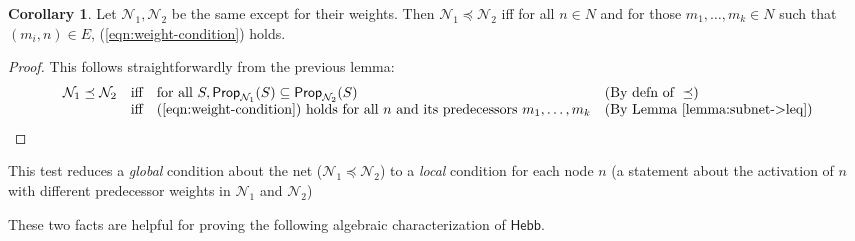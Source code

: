 \documentclass[letterpaper]{article}
\theoremstyle{definition}
\newtheorem{corollary}{Corollary}
\newcommand{\Prop}{\textsf{Prop}}
\newcommand{\Inc}{\textsf{Hebb}}
\newcommand{\Net}{\mathcal{N}}
\begin{document}
\begin{corollary}
\label{corollary:subnet->weights}
Let $\Net_1, \Net_2$ be the same except for their weights.  Then $\Net_1 \preceq \Net_2$ iff for all $n \in N$ and for those $m_1, \ldots, m_k \in N$ such that $(m_i, n) \in E$, (\ref{eqn:weight-condition}) holds.
\end{corollary}
\begin{proof}
This follows straightforwardly from the previous lemma:
\[
\begin{array}{lcll}
    \Net_1 \preceq \Net_2 & \mbox{iff} & \mbox{for all } S, \Prop_{\Net_1}(S) \subseteq \Prop_{\Net_2}(S) & (\mbox{By defn of } \preceq) \\
    & \mbox{iff} & \mbox{(\ref{eqn:weight-condition}) holds for all } n \mbox{ and its predecessors }m_1, \ldots, m_k & (\mbox{By Lemma~\ref{lemma:subnet->leq}})
\end{array} \qedhere
\]
\end{proof}
This test reduces a \emph{global} condition about the net ($\Net_1 \preceq \Net_2$) to a \emph{local} condition for each node $n$ (a statement about the activation of $n$ with different predecessor weights in $\Net_1$ and $\Net_2$)

These two facts are helpful for proving the following algebraic characterization of $\Inc$.
\end{document}
